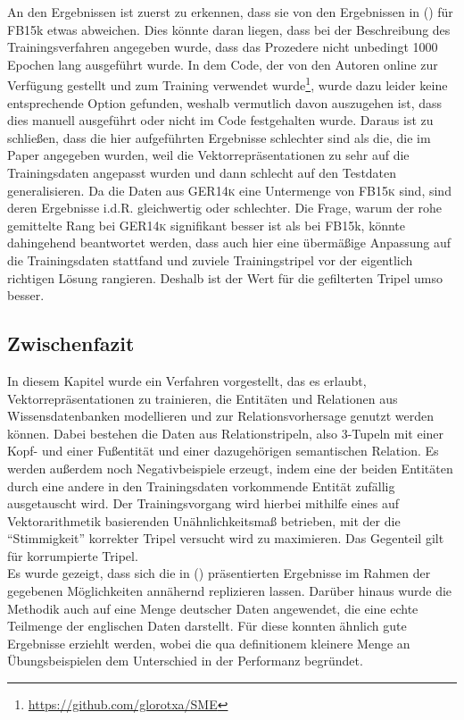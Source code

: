 An den Ergebnissen ist zuerst zu erkennen, dass sie von den Ergebnissen in (\cite{bordes2013translating}) für FB15k etwas abweichen.
Dies könnte daran liegen, dass bei der Beschreibung des Trainingsverfahren angegeben wurde, dass das Prozedere
nicht unbedingt 1000 Epochen lang ausgeführt wurde. In dem Code, der von den Autoren online zur Verfügung gestellt und
zum Training verwendet wurde\footnote{\url{https://github.com/glorotxa/SME}}, wurde dazu leider keine entsprechende Option gefunden, weshalb vermutlich davon auszugehen
ist, dass dies manuell ausgeführt oder nicht im Code festgehalten wurde.
Daraus ist zu schließen, dass die hier aufgeführten Ergebnisse schlechter sind als die,
die im Paper angegeben wurden, weil die Vektorrepräsentationen zu sehr auf die Trainingsdaten angepasst wurden und dann schlecht
auf den Testdaten generalisieren. Da die Daten aus \textsc{GER14k} eine Untermenge von \textsc{FB15k} sind, sind deren Ergebnisse
i.d.R. gleichwertig oder schlechter. Die Frage, warum der rohe gemittelte Rang bei \textsc{GER14k} signifikant besser ist als
bei FB15k, könnte dahingehend beantwortet werden, dass auch hier eine übermäßige Anpassung auf die Trainingsdaten stattfand und
zuviele Trainingstripel vor der eigentlich richtigen Lösung rangieren. Deshalb ist der Wert für die gefilterten Tripel umso
besser.

\subsection{Zwischenfazit}

In diesem Kapitel wurde ein Verfahren vorgestellt, das es erlaubt, Vektorrepräsentationen zu trainieren, die Entitäten und Relationen
aus Wissensdatenbanken modellieren und zur Relationsvorhersage genutzt werden können. Dabei bestehen die Daten aus Relationstripeln,
also 3-Tupeln mit einer Kopf- und einer Fußentität und einer dazugehörigen semantischen Relation. Es werden außerdem noch
Negativbeispiele erzeugt, indem eine der beiden Entitäten durch eine andere in den Trainingsdaten vorkommende Entität zufällig ausgetauscht wird.
Der Trainingsvorgang wird hierbei mithilfe eines auf Vektorarithmetik basierenden Unähnlichkeitsmaß betrieben, mit der
die ``Stimmigkeit'' korrekter Tripel versucht wird zu maximieren. Das Gegenteil gilt für korrumpierte Tripel.\\
Es wurde gezeigt, dass sich die in (\cite{bordes2011learning}) präsentierten Ergebnisse im Rahmen der gegebenen Möglichkeiten
annähernd replizieren lassen. Darüber hinaus wurde die Methodik auch auf eine Menge deutscher Daten angewendet, die eine
echte Teilmenge der englischen Daten darstellt. Für diese konnten ähnlich gute Ergebnisse erziehlt werden, wobei die qua
definitionem kleinere Menge an Übungsbeispielen dem Unterschied in der Performanz begründet.\\

